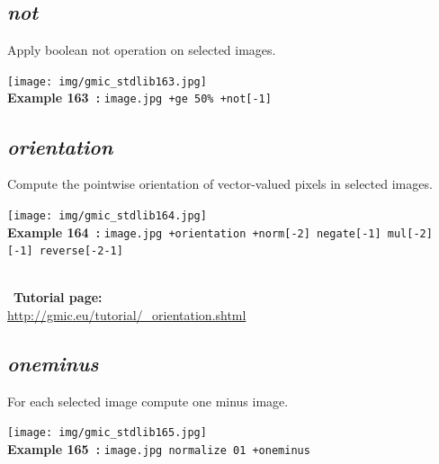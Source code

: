 \documentclass[a4paper,10.5pt,twoside]{book}
\def\comma{\discretionary{,}{}{,}}
\begin{document}
\subsection{\emph{not} }\vspace*{-0.7em}
Apply boolean not operation on selected images.
\begin{center}\texttt{[image: img/gmic\_stdlib163.jpg]}\\
{\footnotesize \textbf{Example 163~:} \texttt{image.jpg +ge 50\% +not[-1]}}
\end{center}

\subsection{\emph{orientation} }\vspace*{-0.7em}
Compute the pointwise orientation of vector-valued pixels in selected images.
\begin{center}\texttt{[image: img/gmic\_stdlib164.jpg]}\\
{\footnotesize \textbf{Example 164~:} \texttt{image.jpg +orientation +norm[-2] negate[-1] mul[-2] [-1] reverse[-2{\comma}-1]}}
\end{center}
~\\
~\textbf{Tutorial page: }\\\url{http://gmic.eu/tutorial/\_orientation.shtml}


\subsection{\emph{oneminus} }\vspace*{-0.7em}
For each selected image{\comma} compute one minus image.
\begin{center}\texttt{[image: img/gmic\_stdlib165.jpg]}\\
{\footnotesize \textbf{Example 165~:} \texttt{image.jpg normalize 0{\comma}1 +oneminus}}
\end{center}
\end{document}
